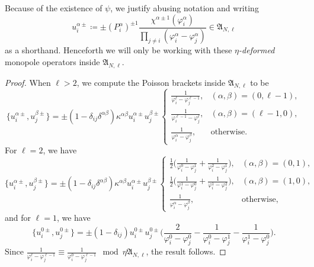 \begin{remark}
    Because of the existence of $\psi$, we justify abusing notation and writing
    \begin{equation}
        u_i^{\alpha\pm} \coloneq \pm (P_i^\alpha)^{\pm 1} \frac{\chi^{\alpha\pm1}(\varphi_i^\alpha)}{\prod_{j \neq i} (\varphi_i^\alpha-\varphi_j^\alpha)} \in \mathfrak{A}_{N,\ell}
    \end{equation}
    as a shorthand. Henceforth we will only be working with these \emph{$\eta$-deformed} monopole operators inside $\mathfrak{A}_{N,\ell}$.
\end{remark}

\begin{proof}
    When $\ell > 2$, we compute the Poisson brackets inside $\mathfrak{A}_{N,\ell}$ to be  
    \begin{equation*}
        \{ u_i^{\alpha\pm},u_j^{\beta\pm} \} = \pm(1-\delta_{ij}\delta^{\alpha\beta})\kappa^{\alpha\beta} u_i^{\alpha\pm} u_j^{\beta\pm}
        \begin{cases}
            \frac{1}{\varphi_i^\ell-\varphi_j^{\ell-1}}, & (\alpha,\beta) = (0,\ell-1), \\
            \frac{1}{\varphi_i^{\ell-1}-\varphi_j^\ell}, & (\alpha,\beta) = (\ell-1,0), \\
            \frac{1}{\varphi_i^\alpha-\varphi_j^\beta}, & \text{otherwise}.
        \end{cases}
    \end{equation*}
    For $\ell=2$, we have
    \begin{equation*}
        \{ u_i^{\alpha\pm},u_j^{\beta\pm} \} = \pm(1-\delta_{ij}\delta^{\alpha\beta})\kappa^{\alpha\beta} u_i^{\alpha\pm} u_j^{\beta\pm}
        \begin{cases}
            \frac{1}{2} \big( \frac{1}{\varphi_i^0-\varphi_j^1} + \frac{1}{\varphi_i^2-\varphi_j^1} \big), & (\alpha,\beta) = (0,1), \\
            \frac{1}{2} \big( \frac{1}{\varphi_i^1-\varphi_j^0} + \frac{1}{\varphi_i^1-\varphi_j^2} \big), & (\alpha,\beta) = (1,0), \\
            \frac{1}{\varphi_i^\alpha-\varphi_j^\beta}, & \text{otherwise},
        \end{cases}
    \end{equation*}
    and for $\ell=1$, we have
    \begin{equation*}
        \{ u_i^{0\pm}, u_j^{0\pm}  \} = \pm (1-\delta_{ij})u_i^{0\pm} u_j^{0\pm} \bigg( \frac{2}{\varphi_i^0-\varphi_j^0} - \frac{1}{\varphi_i^0-\varphi_j^1} - \frac{1}{\varphi_i^1-\varphi_j^0} \bigg).
    \end{equation*}
    Since $\frac{1}{\varphi_i^\ell - \varphi_j^{\ell-1}} \equiv \frac{1}{\varphi_i^0 - \varphi_j^{\ell-1}} \mod \eta \mathfrak{A}_{N,\ell}$, the result follows.
\end{proof}

